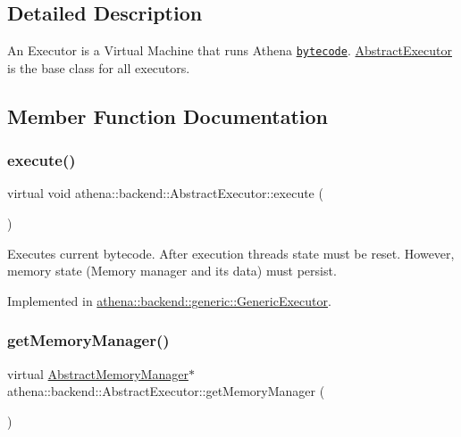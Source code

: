 \subsection{Detailed Description}
An Executor is a Virtual Machine that runs Athena \href{https://athenaframework.ml/athena/bytecode/basics.html}{\tt bytecode}. \mbox{\hyperlink{classathena_1_1backend_1_1_abstract_executor}{Abstract\+Executor}} is the base class for all executors. 

\subsection{Member Function Documentation}
\mbox{\label{classathena_1_1backend_1_1_abstract_executor_a5f179146ae76002b678a4862553f87ce}} 
\subsubsection{\texorpdfstring{execute()}{execute()}}
{\footnotesize\ttfamily virtual void athena\+::backend\+::\+Abstract\+Executor\+::execute (\begin{DoxyParamCaption}{ }\end{DoxyParamCaption})\hspace{0.3cm}{\ttfamily [pure virtual]}}

Executes current bytecode. After execution threads state must be reset. However, memory state (Memory manager and its data) must persist. 

Implemented in \mbox{\hyperlink{classathena_1_1backend_1_1generic_1_1_generic_executor_a38b56c284050d31198b28fcb6595bc73}{athena\+::backend\+::generic\+::\+Generic\+Executor}}.

\mbox{\label{classathena_1_1backend_1_1_abstract_executor_a6d61486e2a06500c9c0aa1e03a475e4a}} 
\subsubsection{\texorpdfstring{get\+Memory\+Manager()}{getMemoryManager()}}
{\footnotesize\ttfamily virtual \mbox{\hyperlink{classathena_1_1backend_1_1_abstract_memory_manager}{Abstract\+Memory\+Manager}}$\ast$ athena\+::backend\+::\+Abstract\+Executor\+::get\+Memory\+Manager (\begin{DoxyParamCaption}{ }\end{DoxyParamCaption})\hspace{0.3cm}{\ttfamily [pure virtual]}}

